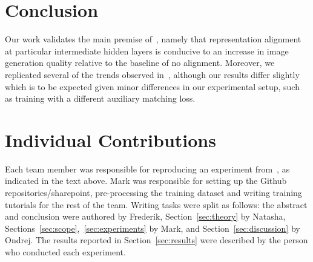 \documentclass{article}
\begin{document}
\section{Conclusion}\label{sec:conclusion}
Our work validates the main premise of~\cite{yu2025repa}, namely that representation alignment at particular intermediate hidden layers is conducive to an increase in image generation quality relative to the baseline of no alignment. Moreover, we replicated several of the trends observed in~\cite{yu2025repa}, although our results differ slightly which is to be expected given minor differences in our experimental setup, such as training with a different auxiliary matching loss.

\section{Individual Contributions}

Each team member was responsible for reproducing an experiment from~\cite{yu2025repa}, as indicated in the text above. Mark was responsible for setting up the Github repositories/sharepoint, pre-processing the training dataset and writing training tutorials for the rest of the team. Writing tasks were split as follows: the abstract and conclusion were authored by Frederik, Section~\ref{sec:theory} by Natasha, Sections~\ref{sec:scope},~\ref{sec:experiments} by Mark, and Section~\ref{sec:discussion} by Ondrej. The results reported in Section~\ref{sec:results} were described by the person who conducted each experiment.




\end{document}
